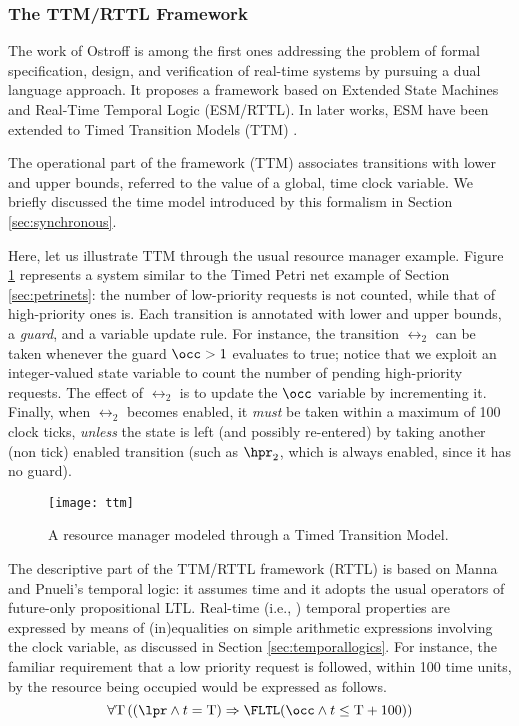 \subsubsection*{The TTM/RTTL Framework}
The work of Ostroff \cite{Ost89} is among the first ones addressing 
the problem of formal specification, design, and verification 
of real-time systems by pursuing a dual language approach. It 
proposes a framework based on Extended State Machines and Real-Time 
Temporal Logic (ESM/RTTL). In later works, ESM have been extended 
to Timed Transition Models (TTM) \cite{Ost90,Ost99}.

The operational part of the framework (TTM) associates transitions 
with lower and upper bounds, referred to the value of a global, 
 time clock variable. We briefly discussed the time model 
introduced by this formalism in Section \ref{sec:synchronous}.

Here, let us illustrate TTM through the usual resource manager
example. Figure \ref{fig:ttm} represents a system similar to the Timed
Petri net example of Section \ref{sec:petrinets}: the number of
low-priority requests is not counted, while that of high-priority ones
is. Each transition is annotated with lower and upper bounds, a
\emph{guard}, and a variable update rule. For instance, the transition
$\rel_2$ can be taken whenever the guard $\occ > 1$ evaluates to true;
notice that we exploit an integer-valued state variable to count the
number of pending high-priority requests. The effect of $\rel_2$ is to
update the $\occ$ variable by incrementing it. Finally, when $\rel_2$
becomes enabled, it \emph{must} be taken within a maximum of 100 clock
ticks, \emph{unless} the state is left (and possibly re-entered) by
taking another (non tick) enabled transition (such as $\hpr_2$, which
is always enabled, since it has no guard).
\begin{figure}[htb!]
	 \centering
	 \texttt{[image: ttm]}
	 \caption{A resource manager modeled through a Timed Transition Model.}
	 \label{fig:ttm}
\end{figure}

The descriptive part of the TTM/RTTL framework (RTTL) is based 
on Manna and Pnueli's temporal logic: it assumes  time 
and it adopts the usual operators of future-only propositional 
LTL. Real-time (i.e., ) temporal properties are expressed 
by means of (in)equalities on simple arithmetic expressions involving 
the clock variable, as discussed in Section \ref{sec:temporallogics}. For instance, 
the familiar requirement that a low priority request is followed, 
within 100 time units, by the resource being occupied would be expressed 
as follows.
\begin{equation*}
 \forall \mathrm{T} \left( ( \lpr \wedge t = \mathrm{T}) \Rightarrow \FLTL ( \occ \wedge t \leq \mathrm{T} + 100 ) \right)
\end{equation*}

